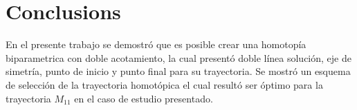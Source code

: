 \documentclass[conference,letterpaper,twocolumn]{IEEEtran}
\begin{document}
\begin{table}[hbtp]
{\small
{}
}
\caption{Three Operating points (solutions) found at $\lambda_1=1$ and $\lambda_2=1$}
\label{yamamuracircuitosoluc1}
\end{table}


\section{Conclusions}

En el presente trabajo se demostró que es posible crear una homotopía biparametrica con doble acotamiento,
la cual presentó doble línea solución, eje de simetría, punto de inicio y punto final para su trayectoria.
Se mostró un esquema de selección de la trayectoria homotópica el cual resultó ser óptimo para la trayectoria $M_{11}$
en el caso de estudio presentado.




\end{document}
